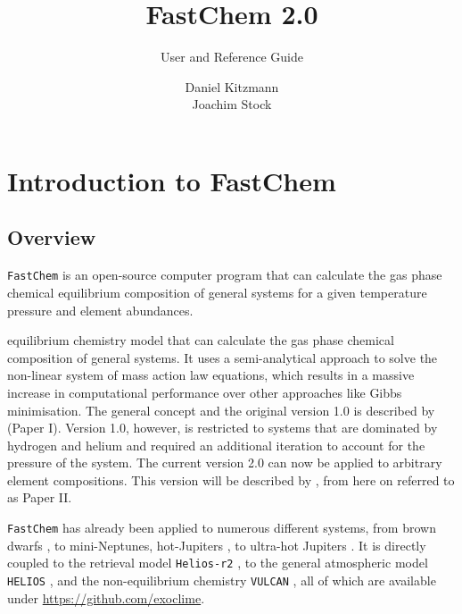 \documentclass[numbers=noenddot]{aux/fcmanual}
\author{Daniel Kitzmann\\
	    Joachim Stock
}
\title{FastChem 2.0}
\subtitle{User and Reference Guide}
\date{}
\newcommand{\fc}{\texttt{FastChem}\xspace}
\newcommand{\ttt}[1]{\texttt {#1}}
\begin{document}
\maketitle


\tableofcontents

\chapter{Introduction to FastChem}

\section{Overview}

\fc is an open-source computer program that can calculate the gas phase chemical equilibrium composition of general systems for a given temperature pressure and element abundances.


equilibrium chemistry model that can calculate the gas phase chemical composition of general systems. It uses a semi-analytical approach to solve the non-linear system of mass action law equations, which results in a massive increase in computational performance over other approaches like Gibbs minimisation. The general concept and the original version 1.0 is described by \citet{Stock2018MNRAS.479..865S} (Paper I). Version 1.0, however, is restricted to systems that are dominated by hydrogen and helium and required an additional iteration to account for the pressure of the system. The current version 2.0 can now be applied to arbitrary element compositions. This version will be described by \citet{Stock2020inprep}, from here on referred to as Paper II.

\fc has already been applied to numerous different systems, from brown dwarfs \citep{Kitzmann2020ApJ...890..174K}, to mini-Neptunes, hot-Jupiters \citep{Bourrier2020A&A...637A..36B}, to ultra-hot Jupiters \citep{Hoeijmakers2019A&A...627A.165H}. It is directly coupled to the retrieval model \ttt{Helios-r2} \citep{Kitzmann2020ApJ...890..174K}, to the general atmospheric model \ttt{HELIOS} \citep{Malik2019AJ....157..170M}, and the non-equilibrium chemistry \ttt{VULCAN} \citep{Tsai2018ApJ...862...31T}, all of which are available under \url{https://github.com/exoclime}.


%
\end{document}
